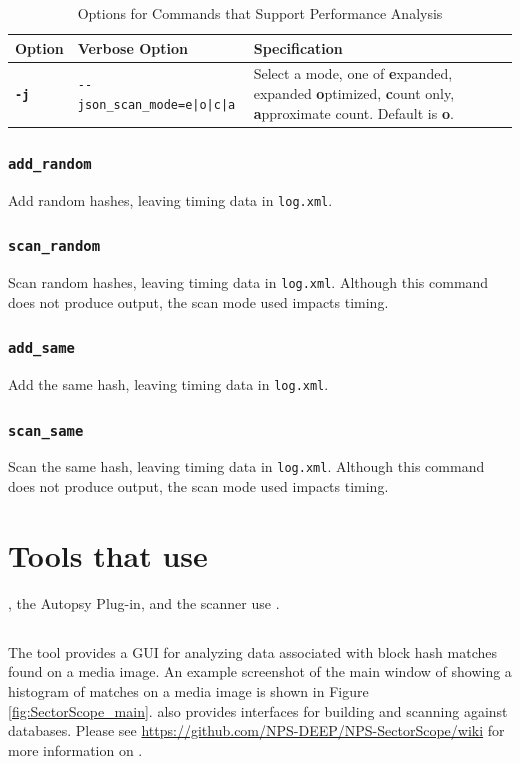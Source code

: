 \documentclass[11pt,fleqn]{article} %
\begin{document}
\begin{table}[!ht]
\centering
\caption{Options for Commands that Support Performance Analysis}
\label{tab:AnalysisOptions}
\begin{tabular}{|p{1.5 cm}|p{8 cm}|p{4 cm}|}
\hline \hline
\textbf{Option} & \textbf{Verbose Option} & \textbf{Specification} \\
\hline
\textbf{\texttt{-j}} & \verb+--json_scan_mode=e|o|c|a+ & Select a mode, one of \textbf{e}xpanded, expanded \textbf{o}ptimized, \textbf{c}ount only, \textbf{a}pproximate count. Default is \textbf{o}.\\
\hline
\end{tabular}
\end{table}

\subsubsection{\texttt{add\_random}}
Add random hashes, leaving timing data in \verb+log.xml+.
\subsubsection{\texttt{scan\_random}}
Scan random hashes, leaving timing data in \verb+log.xml+. Although this command does not produce output, the scan mode used impacts timing.
\subsubsection{\texttt{add\_same}}
Add the same hash, leaving timing data in \verb+log.xml+.
\subsubsection{\texttt{scan\_same}}
Scan the same hash, leaving timing data in \verb+log.xml+. Although this command does not produce output, the scan mode used impacts timing.

\section{Tools that use \hdb}
\label{OtherTools}
\sscope, the \sscope Autopsy Plug-in, and the \bulk \hdb scanner use \hdb.

\subsection{\sscope}
The \sscope tool provides a GUI for analyzing data associated with block hash matches found on a media image. An example screenshot of the main window of \sscope showing a histogram of matches on a media image is shown in Figure \ref{fig:SectorScope_main}. \sscope also provides interfaces for building and scanning against \hdb databases. Please see \url{https://github.com/NPS-DEEP/NPS-SectorScope/wiki} for more information on \sscope.
\end{document}
